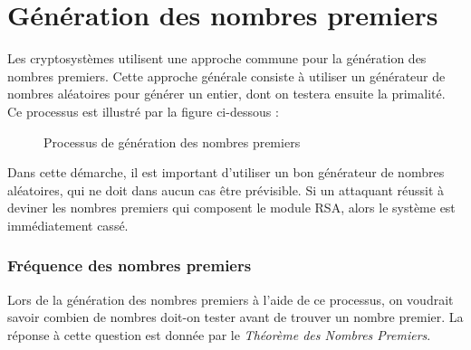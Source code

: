 \section{Génération des nombres premiers}

	Les cryptosystèmes utilisent une approche commune pour la génération des nombres premiers. Cette approche générale consiste à utiliser un générateur de nombres aléatoires pour générer un entier, dont on testera ensuite la primalité. Ce processus est illustré par la figure ci-dessous :
	
	\begin{figure}[H]
		\begin{center}
		\end{center}
		\caption{Processus de génération des nombres premiers}\label{fig:M2}
	\end{figure}
	Dans cette démarche, il est important d'utiliser un bon générateur de nombres aléatoires, qui ne doit dans aucun cas être prévisible. Si un attaquant réussit à deviner les nombres premiers qui composent le module RSA, alors le système est immédiatement cassé.

	\subsubsection*{Fréquence des nombres premiers}
	Lors de la génération des nombres premiers à l'aide de ce processus, on voudrait savoir combien de nombres doit-on tester avant de trouver un nombre premier. La réponse à cette question est donnée par le \textit{Théorème des Nombres Premiers}.
	
